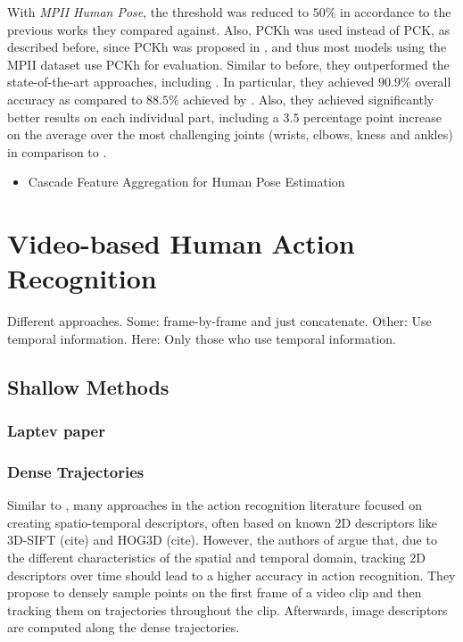 With \textit{MPII Human Pose}, the threshold was reduced to $50\%$ in accordance to the previous works they compared against.
Also, PCKh was used instead of PCK, as described before, since PCKh was proposed in \cite{andriluka_2d_2014}, and thus most models using the MPII dataset use PCKh for evaluation.
Similar to before, they outperformed the state-of-the-art approaches, including \cite{wei_convolutional_2016}.
In particular, they achieved $90.9\%$ overall accuracy as compared to $88.5\%$ achieved by \cite{wei_convolutional_2016}.
Also, they achieved significantly better results on each individual part, including a $3.5$ percentage point increase on the average over the most challenging joints (wrists, elbows, kness and ankles) in comparison to \cite{wei_convolutional_2016}. 

\begin{itemize}
    \item Cascade Feature Aggregation for Human Pose Estimation \cite{su_cascade_2019}
\end{itemize}

\section{Video-based Human Action Recognition}

Different approaches.
Some: frame-by-frame and just concatenate.
Other: Use temporal information.
Here: Only those who use temporal information.

\subsection{Shallow Methods}
\subsubsection{Laptev paper}
\label{sec:laptev-shallow}


\subsubsection{Dense Trajectories}
\label{sec:dense-trajectories}

Similar to \cite{laptev_learning_2008}, many approaches in the action recognition literature focused on creating spatio-temporal descriptors, often based on known 2D descriptors like 3D-SIFT (cite) and HOG3D (cite).
However, the authors of \cite{wang_dense_2013} argue that, due to the different characteristics of the spatial and temporal domain, tracking 2D descriptors over time should lead to a higher accuracy in action recognition.
They propose to densely sample points on the first frame of a video clip and then tracking them on trajectories throughout the clip.
Afterwards, image descriptors are computed along the dense trajectories.

